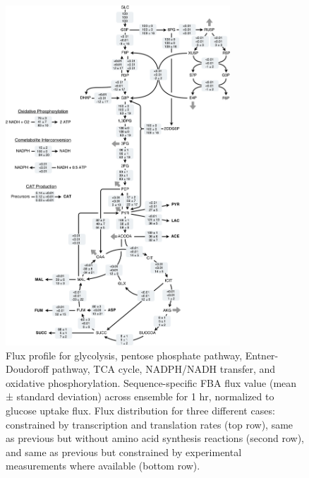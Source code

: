 \documentclass[12pt]{article}
\begin{document}
\begin{figure}[ht]
\centering
\includegraphics[width=0.75\textwidth]{./Figures/CAT_flux_final.pdf}
\caption{Flux profile for glycolysis, pentose phosphate pathway, Entner-Doudoroff pathway, TCA cycle, NADPH/NADH transfer, and oxidative phosphorylation. Sequence-specific FBA flux value (mean ± standard deviation) across ensemble for 1 hr, normalized to glucose uptake flux. Flux distribution for three different cases: constrained by transcription and translation rates (top row), same as previous but without amino acid synthesis reactions  (second row), and same as previous but constrained by experimental measurements where available (bottom row).}
\label{fig:Network}
\end{figure}
\end{document}
